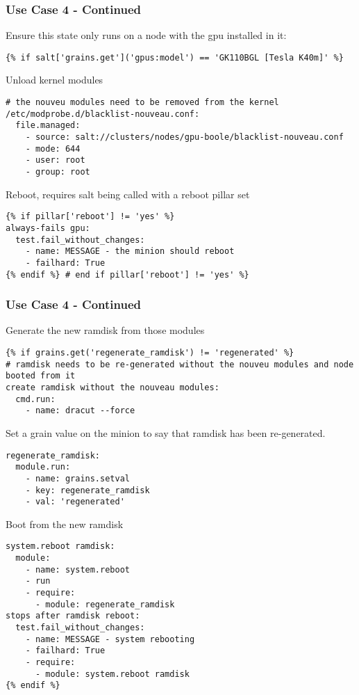 \documentclass{beamer}
\begin{document}
\begin{frame}[fragile]
\frametitle{Use Case 4 - Continued}


Ensure this state only runs on a node with the gpu installed in it:\\
\begin{lstlisting}[basicstyle=\tiny,]
{% if salt['grains.get']('gpus:model') == 'GK110BGL [Tesla K40m]' %}
\end{lstlisting}

Unload kernel modules 
\begin{lstlisting}[basicstyle=\tiny,]
# the nouveu modules need to be removed from the kernel
/etc/modprobe.d/blacklist-nouveau.conf:
  file.managed:
    - source: salt://clusters/nodes/gpu-boole/blacklist-nouveau.conf
    - mode: 644
    - user: root
    - group: root
\end{lstlisting}
Reboot, requires salt being called with a reboot pillar set
\begin{lstlisting}[basicstyle=\tiny,]
{% if pillar['reboot'] != 'yes' %}
always-fails gpu:
  test.fail_without_changes:
    - name: MESSAGE - the minion should reboot 
    - failhard: True
{% endif %} # end if pillar['reboot'] != 'yes' %}
\end{lstlisting}
\end{frame}

\begin{frame}[fragile]
\frametitle{Use Case 4 - Continued}

Generate the new ramdisk from those modules\\

\begin{lstlisting}[basicstyle=\tiny,]
{% if grains.get('regenerate_ramdisk') != 'regenerated' %}
# ramdisk needs to be re-generated without the nouveu modules and node booted from it
create ramdisk without the nouveau modules:
  cmd.run:
    - name: dracut --force
\end{lstlisting}

Set a grain value on the minion to say that ramdisk has been re-generated.\\

\begin{lstlisting}[basicstyle=\tiny,]
regenerate_ramdisk:
  module.run:
    - name: grains.setval
    - key: regenerate_ramdisk
    - val: 'regenerated'
\end{lstlisting}

Boot from the new ramdisk\\

\begin{lstlisting}[basicstyle=\tiny,]
system.reboot ramdisk:
  module:
    - name: system.reboot
    - run
    - require:
      - module: regenerate_ramdisk
stops after ramdisk reboot:
  test.fail_without_changes:
    - name: MESSAGE - system rebooting
    - failhard: True
    - require:
      - module: system.reboot ramdisk
{% endif %}
\end{lstlisting}
\end{frame}
\end{document}
